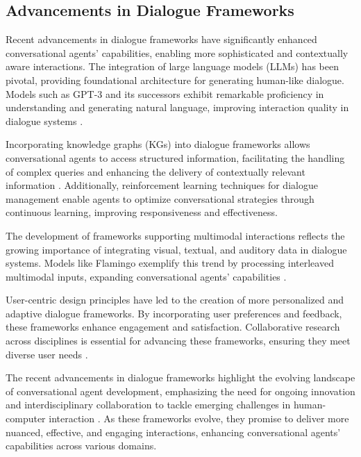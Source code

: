 \subsection{Advancements in Dialogue Frameworks} \label{subsec:Advancements in Dialogue Frameworks}

Recent advancements in dialogue frameworks have significantly enhanced conversational agents' capabilities, enabling more sophisticated and contextually aware interactions. The integration of large language models (LLMs) has been pivotal, providing foundational architecture for generating human-like dialogue. Models such as GPT-3 and its successors exhibit remarkable proficiency in understanding and generating natural language, improving interaction quality in dialogue systems \cite{JudgingLLM1}.

Incorporating knowledge graphs (KGs) into dialogue frameworks allows conversational agents to access structured information, facilitating the handling of complex queries and enhancing the delivery of contextually relevant information \cite{chaudhuri2021groundingdialoguesystemsknowledge}. Additionally, reinforcement learning techniques for dialogue management enable agents to optimize conversational strategies through continuous learning, improving responsiveness and effectiveness.

The development of frameworks supporting multimodal interactions reflects the growing importance of integrating visual, textual, and auditory data in dialogue systems. Models like Flamingo exemplify this trend by processing interleaved multimodal inputs, expanding conversational agents' capabilities \cite{alayrac2022flamingo}.

User-centric design principles have led to the creation of more personalized and adaptive dialogue frameworks. By incorporating user preferences and feedback, these frameworks enhance engagement and satisfaction. Collaborative research across disciplines is essential for advancing these frameworks, ensuring they meet diverse user needs \cite{korre2023takesvillagemultidisciplinaritycollaboration}.

The recent advancements in dialogue frameworks highlight the evolving landscape of conversational agent development, emphasizing the need for ongoing innovation and interdisciplinary collaboration to tackle emerging challenges in human-computer interaction \cite{korre2023takesvillagemultidisciplinaritycollaboration}. As these frameworks evolve, they promise to deliver more nuanced, effective, and engaging interactions, enhancing conversational agents' capabilities across various domains.

